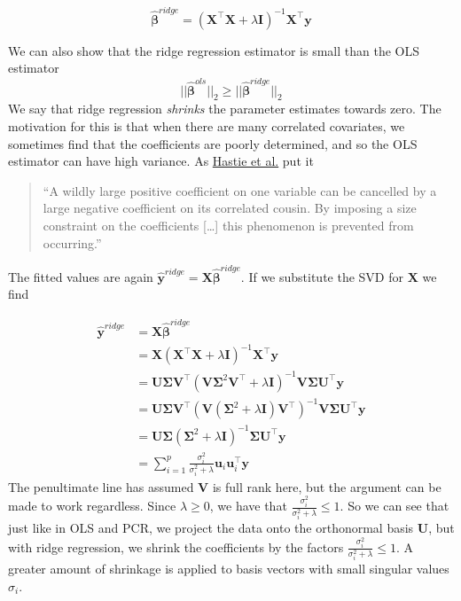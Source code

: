 \documentclass[
]{book}
\theoremstyle{definition}
\theoremstyle{definition}
\theoremstyle{definition}
\theoremstyle{definition}
\theoremstyle{remark}
\begin{document}
\[\hat{\boldsymbol \beta}^{ridge} = (\mathbf X^\top \mathbf X+ \lambda\mathbf I)^{-1}\mathbf X^\top \mathbf y\]

We can also show that the ridge regression estimator is small than the OLS estimator
\[||\hat{\boldsymbol \beta}^{ols}||_2 \geq ||\hat{\boldsymbol \beta}^{ridge}||_2\]
We say that ridge regression \emph{shrinks} the parameter estimates towards zero. The motivation for this is that when there are many correlated covariates, we sometimes find that the coefficients are poorly determined, and so the OLS estimator can have high variance. As \href{https://web.stanford.edu/~hastie/Papers/ESLII.pdf}{Hastie et al.} put it

\begin{quote}
``A wildly large positive coefficient on one variable can be cancelled by a large negative coefficient on its correlated cousin. By imposing a size constraint on the coefficients {[}\ldots{]} this phenomenon is prevented from occurring.''
\end{quote}

The fitted values are again \(\hat{\mathbf y}^{ridge} = \mathbf X\hat{\boldsymbol \beta}^{ridge}\).
If we substitute the SVD for \(\mathbf X\) we find

\begin{align*}
\hat{\mathbf y}^{ridge}&=\mathbf X\hat{\boldsymbol \beta}^{ridge}\\
&=\mathbf X(\mathbf X^\top \mathbf X+ \lambda\mathbf I)^{-1}\mathbf X^\top \mathbf y\\
&=\mathbf U\boldsymbol{\Sigma}\mathbf V^\top(\mathbf V\boldsymbol{\Sigma}^2 \mathbf V^\top +\lambda\mathbf I)^{-1}\mathbf V\boldsymbol{\Sigma}\mathbf U^\top \mathbf y\\
&=\mathbf U\boldsymbol{\Sigma}\mathbf V^\top(\mathbf V(\boldsymbol{\Sigma}^2  +\lambda\mathbf I)\mathbf V^\top)^{-1}\mathbf V\boldsymbol{\Sigma}\mathbf U^\top \mathbf y\\
&=\mathbf U\boldsymbol{\Sigma}(\boldsymbol{\Sigma}^2  +\lambda\mathbf I)^{-1}\boldsymbol{\Sigma}\mathbf U^\top \mathbf y\\
&= \sum_{i=1}^p \frac{\sigma^2_i}{\sigma^2_i+\lambda} \mathbf u_i \mathbf u_i^\top \mathbf y
\end{align*}
The penultimate line has assumed \(\mathbf V\) is full rank here, but the argument can be made to work regardless. Since \(\lambda\geq 0\), we have that \(\frac{\sigma^2_i}{\sigma^2_i+\lambda}\leq 1\). So we can see that just like in OLS and PCR, we project the data onto the orthonormal basis \(\mathbf U\), but with ridge regression, we shrink the coefficients by the factors \(\frac{\sigma^2_i}{\sigma^2_i+\lambda}\leq 1\). A greater amount of shrinkage is applied to basis vectors with small singular values \(\sigma_i\).
\end{document}
